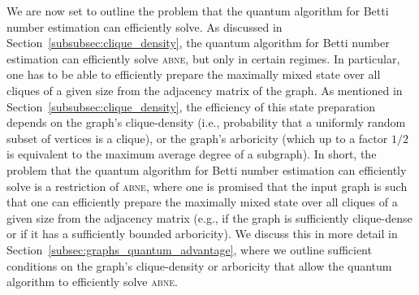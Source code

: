 \documentclass[a4paper, onecolumn, accepted=2022-08-28]{quantumarticle}
\begin{document}
We are now set to outline the problem that the quantum algorithm for Betti number estimation can efficiently solve.
As discussed in Section~\ref{subsubsec:clique_density}, the quantum algorithm for Betti number estimation can efficiently solve \textsc{abne}, but only in certain regimes.
In particular, one has to be able to efficiently prepare the maximally mixed state over all cliques of a given size from the adjacency matrix of the graph.
As mentioned in Section~\ref{subsubsec:clique_density}, the efficiency of this state preparation depends on the graph's clique-density (i.e., probability that a uniformly random subset of vertices is a clique), or the graph's arboricity (which up to a factor $1/2$ is equivalent to the maximum average degree of a subgraph).
In short, the problem that the quantum algorithm for Betti number estimation can efficiently solve is a restriction of \textsc{abne}, where one is promised that the input graph is such that one can efficiently prepare the maximally mixed state over all cliques of a given size from the adjacency matrix (e.g., if the graph is sufficiently clique-dense or if it has a sufficiently bounded arboricity).
We discuss this in more detail in Section~\ref{subsec:graphs_quantum_advantage}, where we outline sufficient conditions on the graph's clique-density or arboricity that allow the quantum algorithm to efficiently solve \textsc{abne}. 
\end{document}
